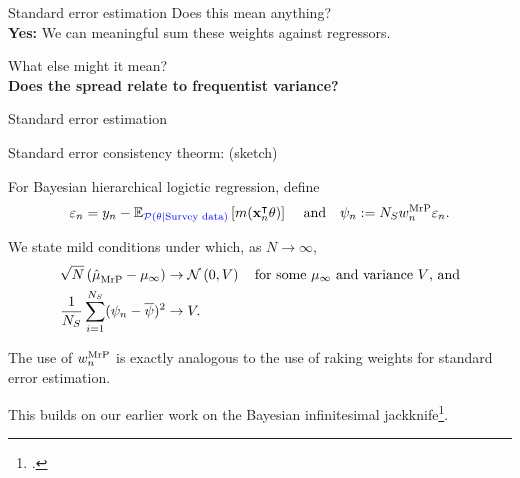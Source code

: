 




\begin{frame}[c]{Standard error estimation}
\centering
{
Does this mean anything?  \\
\textbf{Yes: }We can meaningful sum these weights against regressors.\\[1em]
}

{
What else might it mean?\\
\textbf{Does the spread relate to frequentist variance?}
}

\splitpagenoline{
    \AlexanderWeightPlot{}
}{
    \LaxWeightPlot{}
}
\end{frame}




\begin{frame}[c]{Standard error estimation}



\begin{block}{Standard error consistency theorm: (sketch)}

For Bayesian hierarchical logictic regression, define
$$
\varepsilon_n = y_n - \mathbb{E}_{\textcolor{blue}{\mathcal{P}(\theta \vert \textrm{Survey data})}}\left[ m(\mathbf{x}_n^\intercal \theta)\right]\,
\quad\textrm{and}\quad
\psi_n := {N_S} w_n^{\mathrm{MrP}} \varepsilon_n.
$$

We state mild conditions under which, as $N \rightarrow \infty$,
$$
\begin{aligned}
    \sqrt{N}\left(\hat{\mu}^{}_{\mathrm{MrP}} - \mu_\infty \right) \rightarrow{}&
    \mathcal{N}\left(0, V\right) \quad\textrm{for some $\mu_\infty$ and variance $V$, and}\\
\frac{1}{{N_S}} \sum_{i=1}^{N_S} (\psi_n - \overline{\psi})^2 \rightarrow{}& V.
\end{aligned}
$$
\end{block}

The use of $w_n^{\mathrm{MrP}}$ is exactly analogous to the use of raking weights
for standard error estimation.

This builds on our earlier work on the Bayesian
infinitesimal jackknife\footcite{giordano:2024:bayesij}.

\end{frame}

